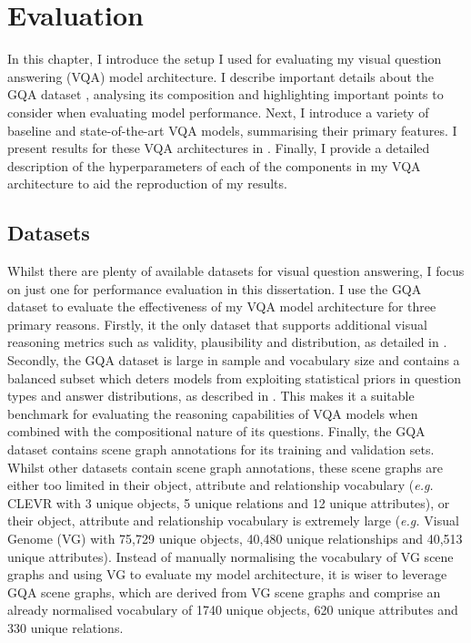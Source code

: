 \chapter{Evaluation}
\label{chapter:evaluation}

In this chapter, I introduce the setup I used for evaluating my visual question answering (VQA) model architecture. I describe important details about the GQA dataset \cite{hudson2019gqa}, analysing its composition and highlighting important points to consider when evaluating model performance. Next, I introduce a variety of baseline and state-of-the-art VQA models, summarising their primary features. I present results for these VQA architectures in \sectionautorefname{ \ref{section:performance_evaluation}}. Finally, I provide a detailed description of the hyperparameters of each of the components in my VQA architecture to aid the reproduction of my results.

\section{Datasets}

Whilst there are plenty of available datasets for visual question answering, I focus on just one for performance evaluation in this dissertation. I use the GQA dataset to evaluate the effectiveness of my VQA model architecture for three primary reasons. Firstly, it the only dataset that supports additional visual reasoning metrics such as validity, plausibility and distribution, as detailed in \subsectionautorefname{ \ref{subsec:visual_reasoning_metrics}}. Secondly, the GQA dataset is large in sample and vocabulary size and contains a balanced subset which deters models from exploiting statistical priors in question types and answer distributions, as described in \subsectionautorefname{ \ref{subsec:lanauge_priors_in_vqa_datasets}}. This makes it a suitable benchmark for evaluating the reasoning capabilities of VQA models when combined with the compositional nature of its questions. Finally, the GQA dataset contains scene graph annotations for its training and validation sets. Whilst other datasets contain scene graph annotations, these scene graphs are either too limited in their object, attribute and relationship vocabulary (\textit{e.g.} CLEVR \cite{johnson2017clevr} with 3 unique objects, 5 unique relations and 12 unique attributes), or their object, attribute and relationship vocabulary is extremely large (\textit{e.g.} Visual Genome (VG) \cite{krishna2017visual} with 75,729 unique objects, 40,480 unique relationships and 40,513 unique attributes). Instead of manually normalising the vocabulary of VG scene graphs and using VG to evaluate my model architecture, it is wiser to leverage GQA scene graphs, which are derived from VG scene graphs and comprise an already normalised vocabulary of 
1740 unique objects, 620 unique attributes and 330 unique relations.

